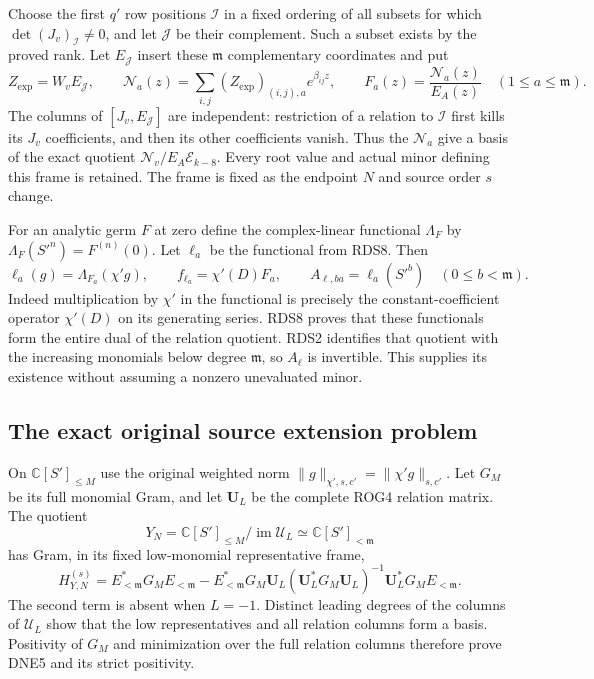 \documentclass[11pt,a4paper]{article}
\begin{document}
Choose the first $q'$ row positions $\mathcal I$ in a fixed
ordering of all subsets for which $\det (J_v)_{\mathcal I}\ne0$,
and let $\mathcal J$ be their complement. Such a subset exists
by the proved rank. Let $E_{\mathcal J}$ insert these
$\mathfrak m$ complementary coordinates and put
\[
 Z_{\exp}=W_vE_{\mathcal J},\qquad
 \mathcal N_a(z)=
   \sum_{i,j}(Z_{\exp})_{(i,j),a}e^{\beta_{ij}z},
 \qquad F_a(z)=\frac{\mathcal N_a(z)}{E_A(z)}
       \quad(1\le a\le\mathfrak m).
 \tag{DNE3}
\]
The columns of $[J_v,E_{\mathcal J}]$ are independent:
restriction of a relation to $\mathcal I$ first kills its
$J_v$ coefficients, and then its other coefficients vanish.
Thus the $\mathcal N_a$ give a basis of the exact quotient
$\mathscr N_v/E_A\mathscr E_{k-8}$. Every root value and
actual minor defining this frame is retained. The frame is
fixed as the endpoint $N$ and source order $s$ change.

For an analytic germ $F$ at zero define the complex-linear
functional $\Lambda_F$ by
$\Lambda_F(S'^n)=F^{(n)}(0)$. Let $\ell_a$ be the
functional from RDS8. Then
\[
 \ell_a(g)=\Lambda_{F_a}(\chi'g),\qquad
 f_{\ell_a}=\chi'(D)F_a,\qquad
 A_{\ell,ba}=\ell_a(S'^b)\quad(0\le b<\mathfrak m).
 \tag{DNE4}
\]
Indeed multiplication by $\chi'$ in the functional is precisely
the constant-coefficient operator $\chi'(D)$ on its generating
series. RDS8 proves that these functionals form the entire dual
of the relation quotient. RDS2 identifies that quotient with
the increasing monomials below degree $\mathfrak m$, so
$A_\ell$ is invertible. This supplies its existence without
assuming a nonzero unevaluated minor.

\subsection{The exact original source extension problem}

On $\mathbb C[S']_{\le M}$ use the original weighted norm
$\|g\|_{\chi',s,c'}=\|\chi'g\|_{s,c'}$. Let $G_M$ be its full
monomial Gram, and let $\mathbf U_L$ be the complete ROG4
relation matrix. The quotient
\[
 Y_N=\mathbb C[S']_{\le M}/\operatorname{im}\mathcal U_L
 \simeq\mathbb C[S']_{<\mathfrak m}
\]
has Gram, in its fixed low-monomial representative frame,
\[
 H_{Y,N}^{(s)}
 =E_{<\mathfrak m}^*G_ME_{<\mathfrak m}
 -E_{<\mathfrak m}^*G_M\mathbf U_L
  (\mathbf U_L^*G_M\mathbf U_L)^{-1}
             \mathbf U_L^*G_ME_{<\mathfrak m}.
 \tag{DNE5}
\]
The second term is absent when $L=-1$. Distinct leading
degrees of the columns of $\mathcal U_L$ show that the low
representatives and all relation columns form a basis.
Positivity of $G_M$ and minimization over the full relation
columns therefore prove DNE5 and its strict positivity.
\end{document}

